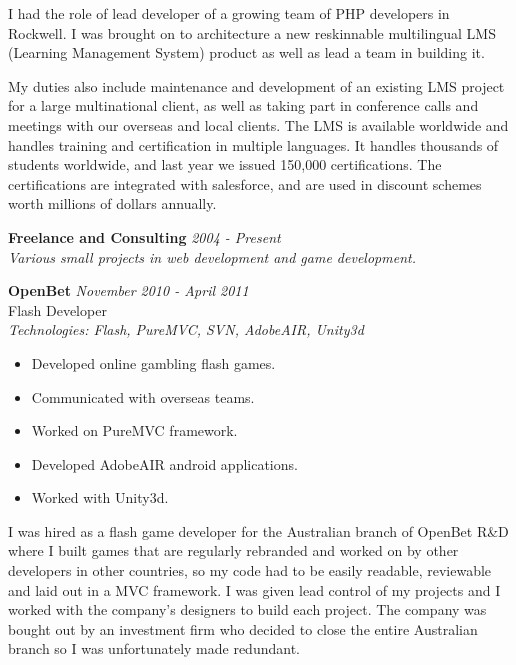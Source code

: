 \documentclass[a4paper,10pt]{article}
\begin{document}
I had the role of lead developer of a growing team of PHP developers in Rockwell. I was brought on to architecture a 
new reskinnable multilingual LMS (Learning Management System) product as well as lead a team in building it.

My duties also include maintenance and development of an existing LMS project for a large multinational client, as 
well as taking part in conference calls and meetings with our overseas and local clients. The LMS is available 
worldwide and handles training and certification in multiple languages. It handles thousands of students worldwide, 
and last year we issued 150,000 certifications. The certifications are integrated with salesforce, and are used in 
discount schemes worth millions of dollars annually.

\vspace{1em}

\textbf{Freelance and Consulting} \hfill \textit{2004 - Present} \\
\textit{Various small projects in web development and game development.}

\vspace{1em}

\textbf{OpenBet} \hfill \textit{November 2010 - April 2011} \\
Flash Developer \\
\textit{Technologies: Flash, PureMVC, SVN, AdobeAIR, Unity3d}
\begin{itemize}
    \item Developed online gambling flash games.
    \item Communicated with overseas teams.
    \item Worked on PureMVC framework.
    \item Developed AdobeAIR android applications.
    \item Worked with Unity3d.
\end{itemize}

I was hired as a flash game developer for the Australian branch of OpenBet R\&D where I built games that are regularly
rebranded and worked on by other developers in other countries, so my code had to be easily readable, reviewable and 
laid out in a MVC framework. I was given lead control of my projects and I worked with the company's designers to 
build each project. The company was bought out by an investment firm who decided to close the entire Australian 
branch so I was unfortunately made redundant.

\vspace{1em}
\end{document}
